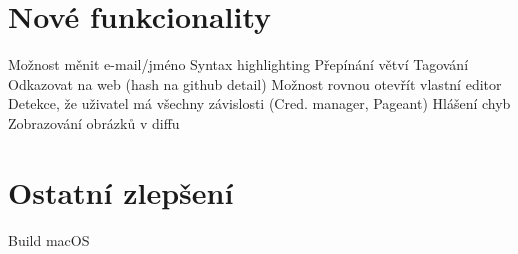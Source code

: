 \section{Nové funkcionality}
Možnost měnit e-mail/jméno
Syntax highlighting
Přepínání větví
Tagování
Odkazovat na web (hash na github detail)
Možnost rovnou otevřít vlastní editor
Detekce, že uživatel má všechny závislosti (Cred. manager, Pageant)
Hlášení chyb
Zobrazování obrázků v diffu


\section{Ostatní zlepšení}
Build macOS
